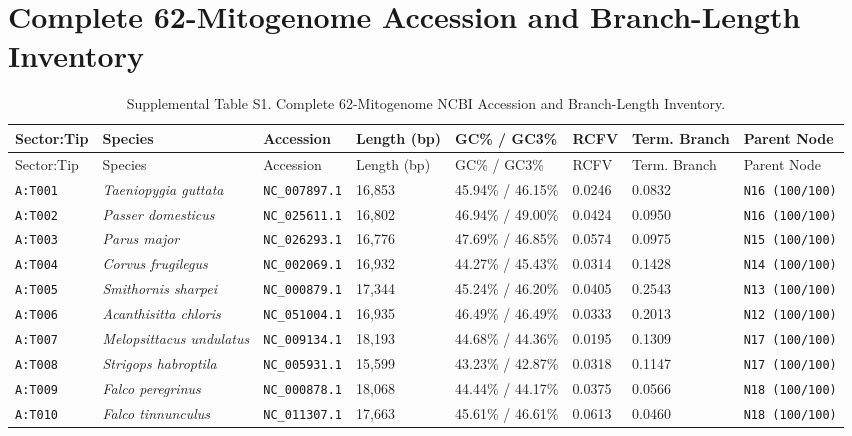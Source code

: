 \documentclass[10pt,letterpaper]{article}
\begin{document}
\section{Complete 62-Mitogenome Accession and Branch-Length Inventory}
\footnotesize
\begin{longtable}{llllllll}
\caption{Supplemental Table S1. Complete 62-Mitogenome NCBI Accession and Branch-Length Inventory.} \\
\toprule
Sector:Tip & Species & Accession & Length (bp) & GC\% / GC3\% & RCFV & Term. Branch & Parent Node \\
\midrule
\endfirsthead
\toprule
Sector:Tip & Species & Accession & Length (bp) & GC\% / GC3\% & RCFV & Term. Branch & Parent Node \\
\midrule
\endhead
\texttt{A:T001} & \textit{Taeniopygia guttata} & \texttt{NC\_007897.1} & 16,853 & 45.94\% / 46.15\% & 0.0246 & 0.0832 & \texttt{N16 (100/100)} \\
\texttt{A:T002} & \textit{Passer domesticus} & \texttt{NC\_025611.1} & 16,802 & 46.94\% / 49.00\% & 0.0424 & 0.0950 & \texttt{N16 (100/100)} \\
\texttt{A:T003} & \textit{Parus major} & \texttt{NC\_026293.1} & 16,776 & 47.69\% / 46.85\% & 0.0574 & 0.0975 & \texttt{N15 (100/100)} \\
\texttt{A:T004} & \textit{Corvus frugilegus} & \texttt{NC\_002069.1} & 16,932 & 44.27\% / 45.43\% & 0.0314 & 0.1428 & \texttt{N14 (100/100)} \\
\texttt{A:T005} & \textit{Smithornis sharpei} & \texttt{NC\_000879.1} & 17,344 & 45.24\% / 46.20\% & 0.0405 & 0.2543 & \texttt{N13 (100/100)} \\
\texttt{A:T006} & \textit{Acanthisitta chloris} & \texttt{NC\_051004.1} & 16,935 & 46.49\% / 46.49\% & 0.0333 & 0.2013 & \texttt{N12 (100/100)} \\
\texttt{A:T007} & \textit{Melopsittacus undulatus} & \texttt{NC\_009134.1} & 18,193 & 44.68\% / 44.36\% & 0.0195 & 0.1309 & \texttt{N17 (100/100)} \\
\texttt{A:T008} & \textit{Strigops habroptila} & \texttt{NC\_005931.1} & 15,599 & 43.23\% / 42.87\% & 0.0318 & 0.1147 & \texttt{N17 (100/100)} \\
\texttt{A:T009} & \textit{Falco peregrinus} & \texttt{NC\_000878.1} & 18,068 & 44.44\% / 44.17\% & 0.0375 & 0.0566 & \texttt{N18 (100/100)} \\
\texttt{A:T010} & \textit{Falco tinnunculus} & \texttt{NC\_011307.1} & 17,663 & 45.61\% / 46.61\% & 0.0613 & 0.0460 & \texttt{N18 (100/100)} \\

\end{longtable}
\end{document}
